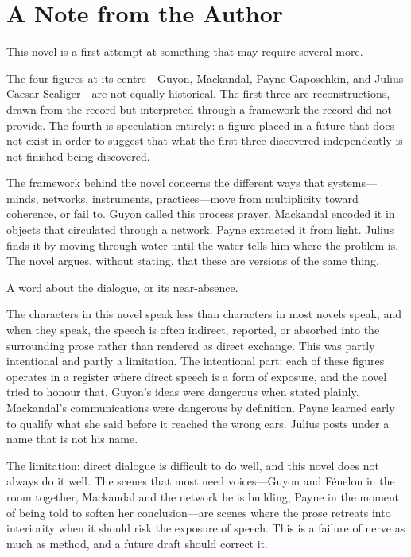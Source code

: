 
\chapter*{A Note from the Author}

\thispagestyle{plain}

This novel is a first attempt at something that may require several more.

The four figures at its centre---Guyon, Mackandal, Payne-Gaposchkin,
and Julius Caesar Scaliger---are not equally historical. The first
three are reconstructions, drawn from the record but interpreted
through a framework the record did not provide. The fourth is
speculation entirely: a figure placed in a future that does not
exist in order to suggest that what the first three discovered
independently is not finished being discovered.

The framework behind the novel concerns the different ways that
systems---minds, networks, instruments, practices---move from
multiplicity toward coherence, or fail to. Guyon called this
process prayer. Mackandal encoded it in objects that circulated
through a network. Payne extracted it from light. Julius finds
it by moving through water until the water tells him where the
problem is. The novel argues, without stating, that these are
versions of the same thing.

A word about the dialogue, or its near-absence.

The characters in this novel speak less than characters in most
novels speak, and when they speak, the speech is often indirect,
reported, or absorbed into the surrounding prose rather than
rendered as direct exchange. This was partly intentional and
partly a limitation. The intentional part: each of these figures
operates in a register where direct speech is a form of exposure,
and the novel tried to honour that. Guyon's ideas were dangerous
when stated plainly. Mackandal's communications were dangerous
by definition. Payne learned early to qualify what she said before
it reached the wrong ears. Julius posts under a name that is not
his name.

The limitation: direct dialogue is difficult to do well, and
this novel does not always do it well. The scenes that most
need voices---Guyon and Fénelon in the room together, Mackandal
and the network he is building, Payne in the moment of being
told to soften her conclusion---are scenes where the prose
retreats into interiority when it should risk the exposure of
speech. This is a failure of nerve as much as method, and a
future draft should correct it.

